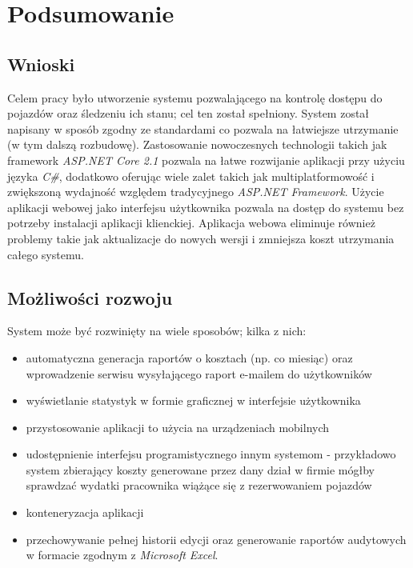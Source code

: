 \documentclass[eng,printmode,openany]{mgr}
\begin{document}
	\newpage
	\chapter{Podsumowanie}
	\section{Wnioski}
	Celem pracy było utworzenie systemu pozwalającego na kontrolę dostępu do pojazdów oraz śledzeniu ich stanu; cel ten został spełniony. System został napisany w sposób zgodny ze standardami co pozwala na łatwiejsze utrzymanie (w tym dalszą rozbudowę). Zastosowanie nowoczesnych technologii takich jak framework \textit{ASP.NET Core 2.1} pozwala na łatwe rozwijanie aplikacji przy użyciu języka \textit{C\#}, dodatkowo oferując wiele zalet takich jak multiplatformowość i zwiększoną wydajność względem tradycyjnego \textit{ASP.NET Framework}. Użycie aplikacji webowej jako interfejsu użytkownika pozwala na dostęp do systemu bez potrzeby instalacji aplikacji klienckiej. Aplikacja webowa eliminuje również problemy takie jak aktualizacje do nowych wersji i zmniejsza koszt utrzymania całego systemu.
	
	\section{Możliwości rozwoju}
	System może być rozwinięty na wiele sposobów; kilka z nich:
	\begin{itemize}
		\item automatyczna generacja raportów o kosztach (np. co miesiąc) oraz wprowadzenie serwisu wysyłającego raport e-mailem do użytkowników 
		\item wyświetlanie statystyk w formie graficznej w interfejsie użytkownika
		\item przystosowanie aplikacji to użycia na urządzeniach mobilnych
		\item udostępnienie interfejsu programistycznego innym systemom - przykładowo system zbierający koszty generowane przez dany dział w firmie mógłby sprawdzać wydatki pracownika wiążące się z rezerwowaniem pojazdów
		\item konteneryzacja aplikacji
		\item przechowywanie pełnej historii edycji oraz generowanie raportów audytowych w formacie zgodnym z \textit{Microsoft Excel}.
	\end{itemize}
	
\end{document}
